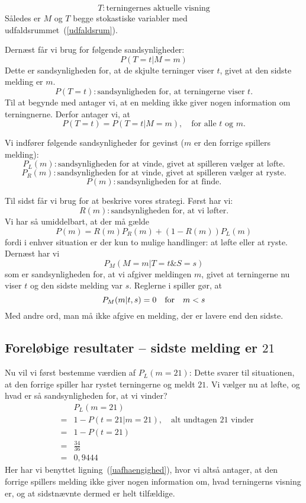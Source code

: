 \documentclass[12pt,oneside,a4paper]{article}
\newcommand{\bas}{\begin{eqnarray*}}
\newcommand{\eas}{\end{eqnarray*}}
\newcommand{\be}{\begin{equation}}
\newcommand{\ee}{\end{equation}}
\begin{document}
$$
T : \mbox{terningernes aktuelle visning}
$$
Således er $M$ og $T$ begge stokastiske variabler med
udfaldsrummet~(\ref{udfaldsrum}).

Dernæst får vi brug for følgende sandsynligheder:
$$
P(T=t| M=m)
$$
Dette er sandsynligheden for, at de skjulte terninger viser $t$,
givet at den sidste melding er $m$.
$$
P(T=t) : \mbox{sandsynligheden for, at terningerne viser $t$.}
$$
Til at begynde med antager vi, at en melding ikke giver nogen information om
terningnerne. Derfor antager vi, at
\be
P(T=t) = P(T=t | M=m), \quad \mbox{for alle $t$ og $m$.}
\label{uafhaengighed}
\ee

Vi indfører følgende sandsynligheder for gevinst ($m$ er den forrige spillers melding):
$$
P_L(m) : \mbox{sandsynligheden for at vinde, givet at spilleren vælger at
løfte.}
$$
$$
P_R(m) : \mbox{sandsynligheden for at vinde, givet at spilleren vælger at
ryste.}
$$
$$
P(m) : \mbox{sandsynligheden for at finde.}
$$

Til sidst får vi brug for at beskrive vores strategi.  Først har vi:
$$
R(m) : \mbox{sandsynligheden for, at vi løfter.}
$$
Vi har så umiddelbart, at der må gælde
\be
P(m) = R(m) P_R(m) + (1-R(m)) P_L(m)
\label{samlet}
\ee
fordi i enhver situation er der kun to mulige handlinger: at løfte eller at ryste.
Dernæst har vi
$$
P_M(M=m | T=t \& S=s)
$$
som er sandsynligheden for, at vi afgiver meldingen $m$, givet at terningerne
nu viser $t$ og den sidste melding var $s$.
Reglerne i spiller gør, at
$$
P_M(m|t,s) = 0 \quad {\rm for} \quad m < s
$$
Med andre ord, man må ikke afgive en melding, der er lavere end den sidste.

\subsection{Foreløbige resultater -- sidste melding er $21$}
Nu vil vi først bestemme værdien af $P_L(m=21)$: Dette svarer til situationen,
at den forrige spiller har rystet terningerne og meldt $21$. Vi vælger nu at
løfte, og hvad er så sandsynligheden for, at vi vinder?
\bas
 && P_L(m=21) \\
&=& 1 - P(t=21|m=21) , \quad \mbox{alt undtagen 21 vinder}\\
&=& 1 - P(t=21) \\
&=& \frac{34}{36} \\
&=& 0,9444
\eas
Her har vi benyttet ligning~(\ref{uafhaengighed}), hvor vi altså antager,
at den forrige spillers melding ikke giver nogen information om, hvad
terningerns visning er, og at sidstnævnte dermed er helt tilfældige.
\end{document}
